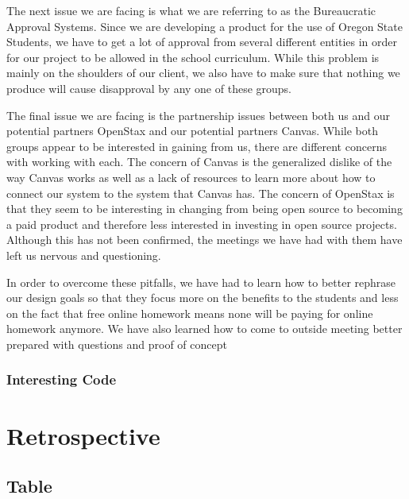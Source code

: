 \documentclass[onecolumn, draftclsnofoot,10pt, compsoc]{IEEEtran}
\begin{document}
The next issue we are facing is what we are referring to as the Bureaucratic Approval Systems. Since we are developing a product for the use of Oregon State Students, we have to get a lot of approval from several different entities in order for our project to be allowed in the school curriculum. While this problem is mainly on the shoulders of our client, we also have to make sure that nothing we produce will cause disapproval by any one of these groups.

The final issue we are facing is the partnership issues between both us and our potential partners OpenStax and our potential partners Canvas. While both groups appear to be interested in gaining from us, there are different concerns with working with each. The concern of Canvas is the generalized dislike of the way Canvas works as well as a lack of resources to learn more about how to connect our system to the system that Canvas has. The concern of OpenStax is that they seem to be interesting in changing from being open source to becoming a paid product and therefore less interested in investing in open source projects. Although this has not been confirmed, the meetings we have had with them have left us nervous and questioning.

In order to overcome these pitfalls, we have had to learn how to better rephrase our design goals so that they focus more on the benefits to the students and less on the fact that free online homework means none will be paying for online homework anymore. We have also learned how to come to outside meeting better prepared with questions and proof of concept

\subsubsection{Interesting Code}

\section{Retrospective}
\subsection{Table}


 
\end{document}
